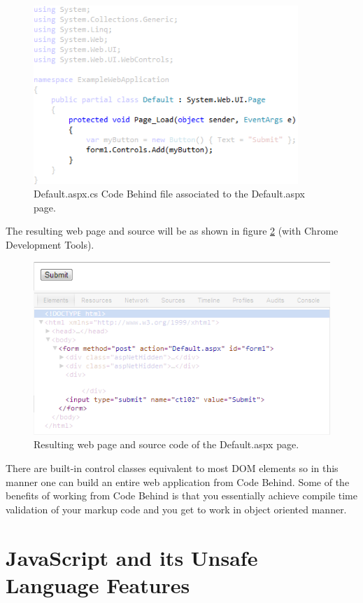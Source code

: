 				\begin{figure}
					\includegraphics[width=10cm]{resources/images/CodeBehind.png}
				\caption{Default.aspx.cs Code Behind file associated to the Default.aspx page.}
				\label{codeBehind}
			\end{figure}
	The resulting web page and source will be as shown in figure \ref{html} (with Chrome Development Tools).

				\begin{figure}
					\includegraphics[width=12cm]{resources/images/Html.png}
				\caption{Resulting web page and source code of the Default.aspx page.}
				\label{html}
			\end{figure}
	There are built-in control classes equivalent to most DOM elements so in this manner one can build an entire web application from Code Behind. Some of the benefits of working from Code Behind is that you essentially achieve compile time validation of your markup code and you get to work in object oriented manner.


\section{JavaScript and its Unsafe Language Features}

